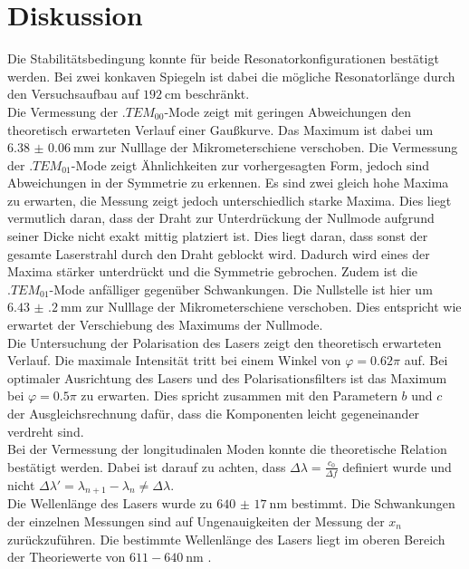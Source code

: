 
\section{Diskussion}
\label{sec:Diskussion}

Die Stabilitätsbedingung konnte für beide Resonatorkonfigurationen bestätigt werden. Bei zwei konkaven Spiegeln ist dabei die mögliche Resonatorlänge durch den Versuchsaufbau auf $\SI{192}{\centi\metre}$ beschränkt.\\
Die Vermessung der $.{TEM}_{00}$-Mode zeigt mit geringen Abweichungen den theoretisch erwarteten Verlauf einer Gaußkurve. Das Maximum ist dabei um $\SI{6.38(6)}{\milli\meter}$ zur Nulllage der Mikrometerschiene verschoben.
Die Vermessung der $.{TEM}_{01}$-Mode zeigt Ähnlichkeiten zur vorhergesagten Form, jedoch sind Abweichungen in der Symmetrie zu erkennen. Es sind zwei gleich hohe Maxima zu erwarten, die Messung zeigt jedoch unterschiedlich starke Maxima. Dies liegt vermutlich daran, dass der Draht zur Unterdrückung der Nullmode aufgrund seiner Dicke nicht exakt mittig platziert ist. Dies liegt daran, dass sonst der gesamte Laserstrahl durch den Draht geblockt wird. Dadurch wird eines der Maxima stärker unterdrückt und die Symmetrie gebrochen. Zudem ist die $.{TEM}_{01}$-Mode anfälliger gegenüber Schwankungen. 
Die Nullstelle ist hier um $\SI{6.43(20)}{\milli\meter}$ zur Nulllage der Mikrometerschiene verschoben. Dies entspricht wie erwartet der Verschiebung des Maximums der Nullmode.\\
Die Untersuchung der Polarisation des Lasers zeigt den theoretisch erwarteten Verlauf. Die maximale Intensität tritt bei einem Winkel von $\varphi=0.62\pi$ auf. Bei optimaler Ausrichtung des Lasers und des Polarisationsfilters ist das Maximum bei $\varphi=0.5\pi$ zu erwarten. Dies spricht zusammen mit den Parametern $b$ und $c$ der Ausgleichsrechnung dafür, dass die Komponenten leicht gegeneinander verdreht sind.\\
Bei der Vermessung der longitudinalen Moden konnte die theoretische Relation bestätigt werden. Dabei ist darauf zu achten, dass $\Delta\lambda=\frac{c_0}{\Delta f}$ definiert wurde und nicht $\Delta\lambda\prime=\lambda_{n+1}-\lambda_n\neq\Delta\lambda$.\\
Die Wellenlänge des Lasers wurde zu $\SI{640(17)}{\nano\metre}$ bestimmt. Die Schwankungen der einzelnen Messungen sind auf Ungenauigkeiten der Messung der $x_n$ zurückzuführen. Die bestimmte Wellenlänge des Lasers liegt im oberen Bereich der Theoriewerte von $611-\SI{640}{\nano\meter}$ \cite{VHeNeGoettingen}. 
